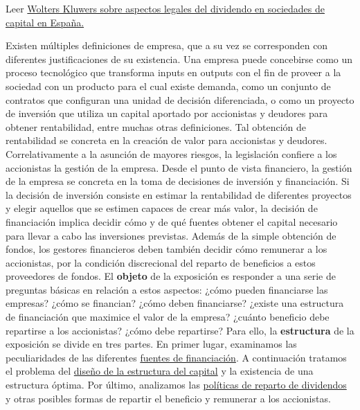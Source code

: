 \documentclass{nuevotema}
\begin{document}
\ideaclave

Leer \href{https://guiasjuridicas.wolterskluwer.es/Content/Documento.aspx?params=H4sIAAAAAAAEAMtMSbF1jTAAAUMTM2MztbLUouLM_DxbIwMDCwNzA0uQQGZapUt-ckhlQaptWmJOcSoA9wD6lDUAAAA=WKE}{Wolters Kluwers sobre aspectos legales del dividendo en sociedades de capital en España.} 


Existen múltiples definiciones de empresa, que a su vez se corresponden con diferentes justificaciones de su existencia. Una empresa puede concebirse como un proceso tecnológico que transforma inputs en outputs con el fin de proveer a la sociedad con un producto para el cual existe demanda, como un conjunto de contratos que configuran una unidad de decisión diferenciada, o como un proyecto de inversión que utiliza un capital aportado por accionistas y deudores para obtener rentabilidad, entre muchas otras definiciones. Tal obtención de rentabilidad se concreta en la creación de valor para accionistas y deudores. Correlativamente a la asunción de mayores riesgos, la legislación confiere a los accionistas la gestión de la empresa. Desde el punto de vista financiero, la gestión de la empresa se concreta en la toma de decisiones de inversión y financiación. Si la decisión de inversión consiste en estimar la rentabilidad de diferentes proyectos y elegir aquellos que se estimen capaces de crear más valor, la decisión de financiación implica decidir cómo y de qué fuentes obtener el capital necesario para llevar a cabo las inversiones previstas. Además de la simple obtención de fondos, los gestores financieros deben también decidir cómo remunerar a los accionistas, por la condición discrecional del reparto de beneficios a estos proveedores de fondos. El \textbf{objeto} de la exposición es responder a una serie de preguntas básicas en relación a estos aspectos: ¿cómo pueden financiarse las empresas? ¿cómo se financian? ¿cómo deben financiarse? ¿existe una estructura de financiación que maximice el valor de la empresa? ¿cuánto beneficio debe repartirse a los accionistas? ¿cómo debe repartirse? Para ello, la \textbf{estructura} de la exposición se divide en tres partes. En primer lugar, examinamos las peculiaridades de las diferentes \underline{fuentes de financiación}. A continuación tratamos el problema del \underline{diseño de la estructura del capital} y la existencia de una estructura óptima. Por último, analizamos las \underline{políticas de reparto de dividendos} y otras posibles formas de repartir el beneficio y remunerar a los accionistas.
\end{document}

